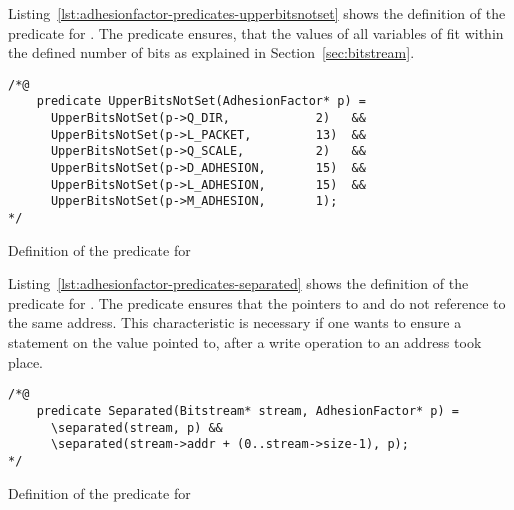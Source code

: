 \FloatBarrier


Listing~\ref{lst:adhesionfactor-predicates-upperbitsnotset} shows the definition of the 
predicate for \adhesion. The predicate ensures, that the values of all variables of \adhesion fit
within the defined number of bits as explained in Section~\ref{sec:bitstream}.

\begin{listing}[hbt]
\begin{minipage}{0.99\textwidth}
\begin{lstlisting}[style=acsl-block]
/*@
    predicate UpperBitsNotSet(AdhesionFactor* p) =
      UpperBitsNotSet(p->Q_DIR,            2)   &&
      UpperBitsNotSet(p->L_PACKET,         13)  &&
      UpperBitsNotSet(p->Q_SCALE,          2)   &&
      UpperBitsNotSet(p->D_ADHESION,       15)  &&
      UpperBitsNotSet(p->L_ADHESION,       15)  &&
      UpperBitsNotSet(p->M_ADHESION,       1);
*/
\end{lstlisting}
\end{minipage}
\caption{\label{lst:adhesionfactor-predicates-upperbitsnotset}Definition of the  predicate for \adhesion}
\end{listing}

\FloatBarrier

Listing~\ref{lst:adhesionfactor-predicates-separated} shows the definition of the 
predicate for \adhesion. The predicate ensures that the pointers to  and \adhesion
do not reference to the same address. This characteristic is necessary if one wants to ensure
a statement on the value pointed to, after a write operation to an address took place.

\begin{listing}[hbt]
\begin{minipage}{0.99\textwidth}
\begin{lstlisting}[style=acsl-block]
/*@
    predicate Separated(Bitstream* stream, AdhesionFactor* p) =
      \separated(stream, p) &&
      \separated(stream->addr + (0..stream->size-1), p);
*/
\end{lstlisting}
\end{minipage}
\caption{\label{lst:adhesionfactor-predicates-separated}Definition of the  predicate for \adhesion}
\end{listing}

\FloatBarrier

